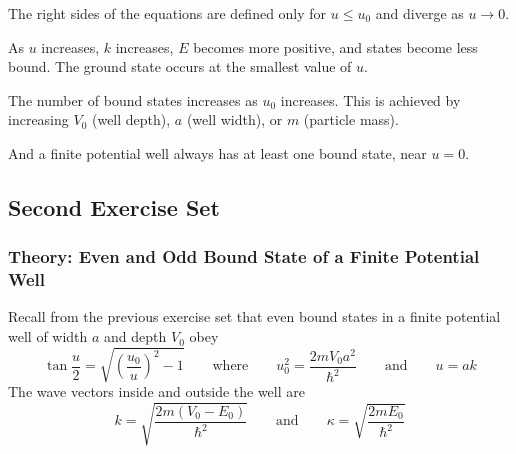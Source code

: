\documentclass[11pt, a4paper]{article}
\newcommand{\eqtext}[1]{\qquad \text{#1} \qquad}
\begin{document}
\begin{itemize}
	The right sides of the equations are defined only for $ u \leq u_{0} $ and diverge as $ u \to 0 $. 
	
	As $ u $ increases, $ k $ increases, $ E $ becomes more positive, and states become less bound. The ground state occurs at the smallest value of $ u $. 
	
	The number of bound states increases as $ u_{0} $ increases. This is achieved by increasing $ V_{0} $ (well depth), $ a $ (well width), or $ m $ (particle mass). 
	
	And a finite potential well always has at least one bound state, near $ u = 0 $. 
\end{itemize}



\subsection{Second Exercise Set}

\subsubsection{Theory: Even and Odd Bound State of a Finite Potential Well}
Recall from the previous exercise set that even bound states in a finite potential well of width $ a $ and depth $ V_{0} $ obey
\begin{equation*}
	\tan \frac{u}{2} = \sqrt{\left(\frac{u_{0}}{u}\right)^{2} -1} \eqtext{where} u_{0}^{2} = \frac{2mV_{0}a^{2}}{\hbar^{2}} \eqtext{and} u = ak
\end{equation*}
The wave vectors inside and outside the well are
\begin{equation*}
	k = \sqrt{\frac{2m(V_{0}- E_{0})}{\hbar^{2}}} \eqtext{and} \kappa = \sqrt{\frac{2mE_{0}}{\hbar^{2}}}
\end{equation*}
\end{document}
